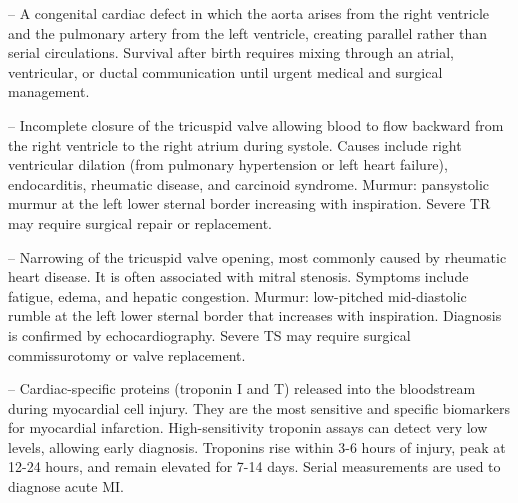 -- A congenital cardiac defect in which the aorta arises from the right ventricle and the pulmonary artery from the left ventricle, creating parallel rather than serial circulations. Survival after birth requires mixing through an atrial, ventricular, or ductal communication until urgent medical and surgical management.

-- Incomplete closure of the tricuspid valve allowing blood to flow backward from the right ventricle to the right atrium during systole. Causes include right ventricular dilation (from pulmonary hypertension or left heart failure), endocarditis, rheumatic disease, and carcinoid syndrome. Murmur: pansystolic murmur at the left lower sternal border increasing with inspiration. Severe TR may require surgical repair or replacement.

-- Narrowing of the tricuspid valve opening, most commonly caused by rheumatic heart disease. It is often associated with mitral stenosis. Symptoms include fatigue, edema, and hepatic congestion. Murmur: low-pitched mid-diastolic rumble at the left lower sternal border that increases with inspiration. Diagnosis is confirmed by echocardiography. Severe TS may require surgical commissurotomy or valve replacement.

-- Cardiac-specific proteins (troponin I and T) released into the bloodstream during myocardial cell injury. They are the most sensitive and specific biomarkers for myocardial infarction. High-sensitivity troponin assays can detect very low levels, allowing early diagnosis. Troponins rise within 3-6 hours of injury, peak at 12-24 hours, and remain elevated for 7-14 days. Serial measurements are used to diagnose acute MI.

